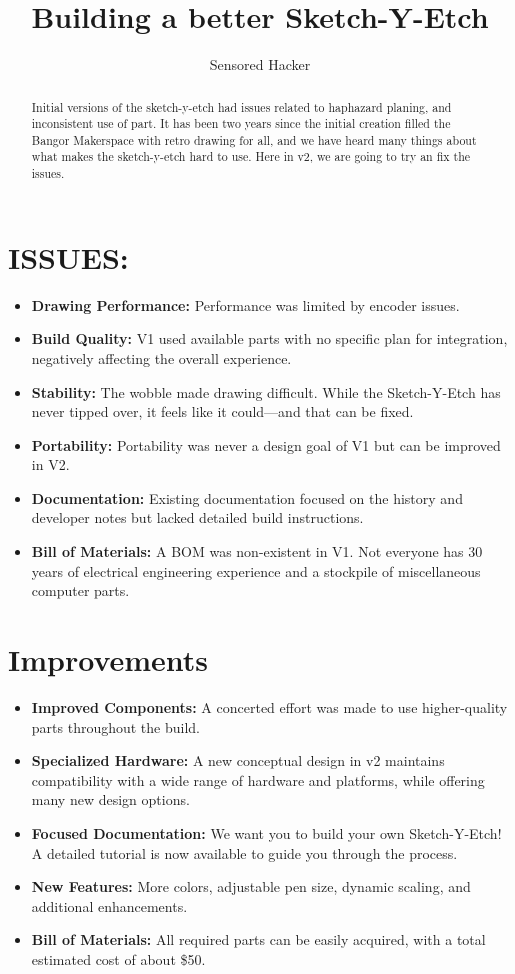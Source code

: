 \documentclass[]{article}
\title{Building a better Sketch-Y-Etch}
\author{Sensored Hacker}
\begin{document}
\maketitle

\begin{abstract}
Initial versions of the sketch-y-etch had issues related to haphazard planing, and inconsistent use of part. It has been two years since the initial creation filled the Bangor Makerspace with retro drawing for all, and we have heard many things about 
what makes the sketch-y-etch hard to use. Here in v2, we are going to try an fix the issues. 
\end{abstract}

\section*{ISSUES:}
\begin{itemize}
	\item \textbf{Drawing Performance:} Performance was limited by encoder issues.
	\item \textbf{Build Quality:} V1 used available parts with no specific plan for integration, negatively affecting the overall experience.
	\item \textbf{Stability:} The wobble made drawing difficult. While the Sketch-Y-Etch has never tipped over, it feels like it could—and that can be fixed.
	\item \textbf{Portability:} Portability was never a design goal of V1 but can be improved in V2.
	\item \textbf{Documentation:} Existing documentation focused on the history and developer notes but lacked detailed build instructions.
	\item \textbf{Bill of Materials:} A BOM was non-existent in V1. Not everyone has 30 years of electrical engineering experience and a stockpile of miscellaneous computer parts.
\end{itemize}

\section*{Improvements}

\begin{itemize}
	\item \textbf{Improved Components:} A concerted effort was made to use higher-quality parts throughout the build.
	\item \textbf{Specialized Hardware:} A new conceptual design in v2 maintains compatibility with a wide range of hardware and platforms, while offering many new design options.
	\item \textbf{Focused Documentation:} We want you to build your own Sketch-Y-Etch! A detailed tutorial is now available to guide you through the process.
	\item \textbf{New Features:} More colors, adjustable pen size, dynamic scaling, and additional enhancements.
	\item \textbf{Bill of Materials:} All required parts can be easily acquired, with a total estimated cost of about \$50.
\end{itemize}
\end{document}

